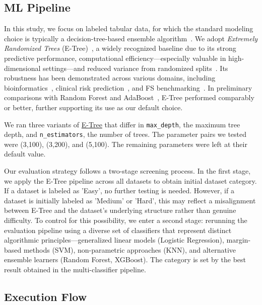 \documentclass[preprint,12pt,authoryear]{elsarticle}
\begin{document}
\subsection{ML Pipeline} \label{sec:ml_flow}
In this study, we focus on labeled tabular data, for which the standard modeling choice is typically a decision-tree-based ensemble algorithm~\cite{grinsztajn2022tree}. We adopt \emph{Extremely Randomized Trees} (E-Tree)~\cite{geurts2006extremely}, a widely recognized baseline due to its strong predictive performance, computational efficiency—especially valuable in high-dimensional settings—and reduced variance from randomized splits~\cite{geurts2006extremely}. Its robustness has been demonstrated across various domains, including bioinformatics~\citep{kocev2020ensembles}, clinical risk prediction~\citep{sutradhar2023boo}, and FS benchmarking~\citep{atashgahi2022quick}. In preliminary comparisons with Random Forest and AdaBoost~\cite{freund1997decision}, E-Tree performed comparably or better, further supporting its use as our default choice.

We ran three variants of  \href{https://scikit-learn.org/dev/modules/generated/sklearn.ensemble.ExtraTreesClassifier.html}{E-Tree} that differ in \texttt{max\_depth}, the maximum tree depth, and \texttt{n\_estimators}, the number of trees. The parameter pairs we tested were (3,100), (3,200), and (5,100). The remaining parameters were left at their default value.



Our evaluation strategy follows a two-stage screening process. In the first stage, we apply the E-Tree pipeline across all datasets to obtain initial dataset category. If a dataset is labeled as 'Easy', no further testing is needed. However, if a dataset is initially labeled as 'Medium' or 'Hard', this may reflect a misalignment between E-Tree and the dataset’s underlying structure rather than genuine difficulty. To control for this possibility, we enter a second stage: rerunning the evaluation pipeline using a diverse set of classifiers that represent distinct algorithmic principles—generalized linear models (Logistic Regression), margin-based methods (SVM), non-parametric approaches (KNN), and alternative ensemble learners (Random Forest, XGBoost). The category is set by the best result obtained in the multi-classifier pipeline. 

\subsection{Execution Flow}\label{sec:execution_flow}
\end{document}
